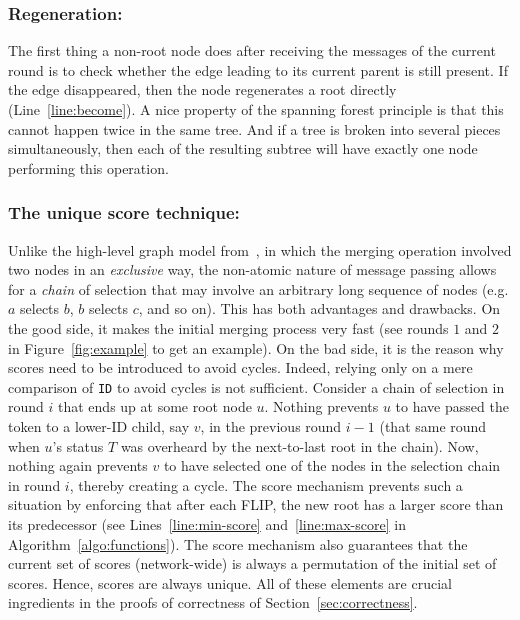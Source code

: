 \documentclass[twocolumn]{article}
\begin{document}
\subsubsection{Regeneration:} The first thing a non-root node does after receiving the messages of the current round is to check whether the edge leading to its current parent is still present. If the edge disappeared, then the node regenerates a root directly (Line~\ref{line:become}). A nice property of the spanning forest principle is that this cannot happen twice in the same tree. And if a tree is broken into several pieces simultaneously, then each of the resulting subtree will have exactly one node performing this operation.


\subsubsection{The unique score technique:}
Unlike the high-level graph model from~\cite{CCGP13}, in which the merging operation involved two nodes in an {\em exclusive} way, the non-atomic nature of message passing allows for a {\em chain} of selection that may involve an arbitrary long sequence of nodes (e.g. $a$ selects $b$, $b$ selects $c$, and so on). This has both advantages and drawbacks. On the good side, it makes the initial merging process very fast (see rounds $1$ and $2$ in Figure~\ref{fig:example} to get an example). On the bad side, it is the reason why scores need to be introduced to avoid cycles. Indeed, relying only on a mere comparison of {\tt ID} to avoid cycles is not sufficient. Consider a chain of selection in round $i$ that ends up at some root node $u$. Nothing prevents $u$ to have passed the token to a lower-ID child, say $v$, in the previous round $i-1$ (that same round when $u$'s status $T$ was overheard by the next-to-last root in the chain). Now, nothing again prevents $v$ to have selected one of the nodes in the selection chain in round $i$, thereby creating a cycle. The score mechanism prevents such a situation by enforcing that after each FLIP, the new root has a larger score than its predecessor (see Lines~\ref{line:min-score} and~\ref{line:max-score} in Algorithm~\ref{algo:functions}). The score mechanism also guarantees that the current set of scores (network-wide) is always a permutation of the initial set of scores. Hence, scores are always unique. All of these elements are crucial ingredients in the proofs of correctness of Section~\ref{sec:correctness}.
\end{document}
